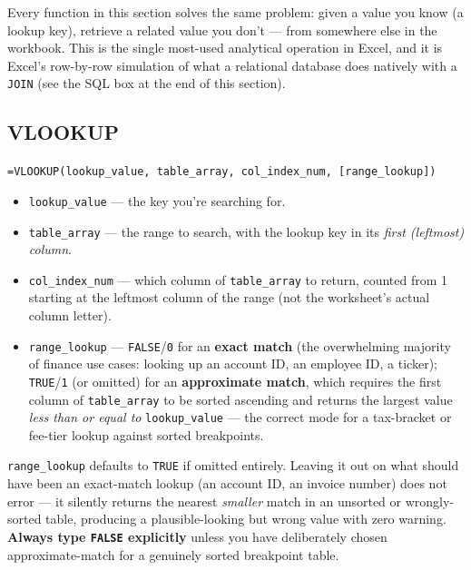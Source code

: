 \documentclass[11pt,a4paper]{article}
\begin{document}
\begin{keyconcept}
Every function in this section solves the same problem: given a value you know (a lookup key), retrieve a related value you don't --- from somewhere else in the workbook. This is the single most-used analytical operation in Excel, and it is Excel's row-by-row simulation of what a relational database does natively with a \texttt{JOIN} (see the SQL box at the end of this section).
\end{keyconcept}

\subsection{VLOOKUP}
\label{sec:vlookup}

\begin{formulasyntax}[VLOOKUP]
\texttt{=VLOOKUP(lookup\_value, table\_array, col\_index\_num, [range\_lookup])}
\begin{itemize}
  \item \texttt{lookup\_value} --- the key you're searching for.
  \item \texttt{table\_array} --- the range to search, with the lookup key in its \emph{first (leftmost) column}.
  \item \texttt{col\_index\_num} --- which column of \texttt{table\_array} to return, counted from 1 starting at the leftmost column of the range (not the worksheet's actual column letter).
  \item \texttt{range\_lookup} --- \texttt{FALSE}/\texttt{0} for an \textbf{exact match} (the overwhelming majority of finance use cases: looking up an account ID, an employee ID, a ticker); \texttt{TRUE}/\texttt{1} (or omitted) for an \textbf{approximate match}, which requires the first column of \texttt{table\_array} to be sorted ascending and returns the largest value \emph{less than or equal to} \texttt{lookup\_value} --- the correct mode for a tax-bracket or fee-tier lookup against sorted breakpoints.
\end{itemize}
\end{formulasyntax}

\begin{pitfall}
\texttt{range\_lookup} defaults to \texttt{TRUE} if omitted entirely. Leaving it out on what should have been an exact-match lookup (an account ID, an invoice number) does not error --- it silently returns the nearest \emph{smaller} match in an unsorted or wrongly-sorted table, producing a plausible-looking but wrong value with zero warning. \textbf{Always type \texttt{FALSE} explicitly} unless you have deliberately chosen approximate-match for a genuinely sorted breakpoint table.
\end{pitfall}
\end{document}
